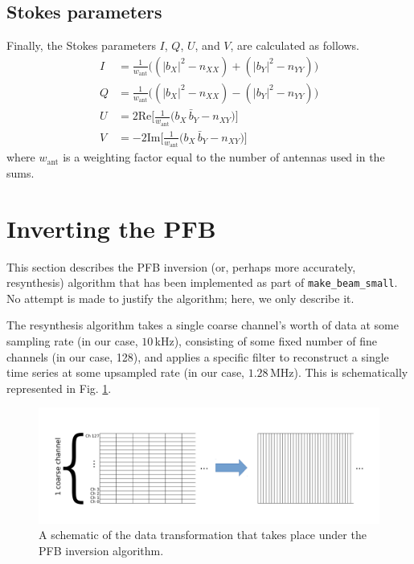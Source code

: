 \documentclass{article}
\begin{document}
\subsection{Stokes parameters}

Finally, the Stokes parameters $I$, $Q$, $U$, and $V$, are calculated as follows.
\begin{align}
    I &= \frac{1}{w_\text{ant}}\bigg((|b_X|^2 - n_{XX}) + (|b_Y|^2 - n_{YY})\bigg) \\
    Q &= \frac{1}{w_\text{ant}}\bigg((|b_X|^2 - n_{XX}) - (|b_Y|^2 - n_{YY})\bigg) \\
    U &=  2 \text{Re}\bigg[\frac{1}{w_\text{ant}}\bigg(b_X\,\bar{b}_Y - n_{XY}\bigg)\bigg]\\
    V &= -2 \text{Im}\bigg[\frac{1}{w_\text{ant}}\bigg(b_X\,\bar{b}_Y - n_{XY}\bigg)\bigg]
\end{align}
where $w_\text{ant}$ is a weighting factor equal to the number of antennas used in the sums.

\newpage
\section{Inverting the PFB}

This section describes the PFB inversion (or, perhaps more accurately, resynthesis) algorithm that has been implemented as part of \texttt{make\_beam\_small}.
No attempt is made to justify the algorithm; here, we only describe it.

The resynthesis algorithm takes a single coarse channel's worth of data at some sampling rate (in our case, $10\,$kHz), consisting of some fixed number of fine channels (in our case, 128), and applies a specific filter to reconstruct a single time series at some upsampled rate (in our case, $1.28\,$MHz).
This is schematically represented in Fig. \ref{fig:schematic}.
\begin{figure}[!ht]
    \centering
    \includegraphics[scale=0.6]{images/pfb_fig1.pdf}
    \vspace{-1cm}
    \caption{A schematic of the data transformation that takes place under the PFB inversion algorithm.}
    \label{fig:schematic}
\end{figure}
\end{document}
